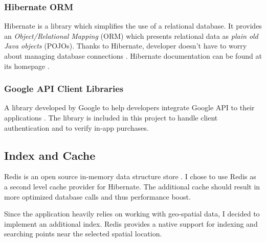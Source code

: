 		\subsubsection*{Hibernate ORM}
		Hibernate is a library which simplifies the use of a relational database. It provides an \textit{Object/Relational Mapping} (ORM) which presents relational data as \textit{plain old Java objects} (POJOs). Thanks to Hibernate, developer doesn't have to worry about managing database connections \cite{hibernatebook}. Hibernate documentation can be found at its homepage \cite{hibernate}.
		
		\subsubsection*{Google API Client Libraries}
		A library developed by Google to help developers integrate Google API to their applications \cite{googleapilibs}. The library is included in this project to handle client authentication and to verify in-app purchases.
		
	\subsection{Index and Cache}
	Redis is an open source in-memory data structure store \cite{redis}. I chose to use Redis as a second level cache provider for Hibernate. The additional cache should result in more optimized database calls and thus performance boost.
	
	Since the application heavily relies on working with geo-spatial data, I decided to implement an additional index. Redis provides a native support for indexing and  searching points near the selected spatial location.		